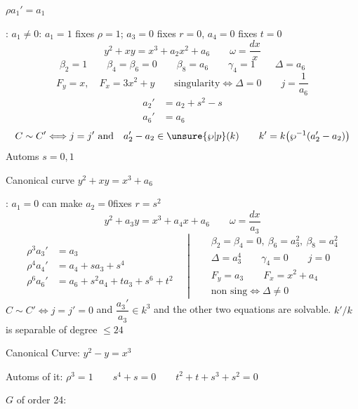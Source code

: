 \qquad $\rho a_1'=a_1$

: \quad $a_1\ne0$: \quad $a_1=1$ fixes $\rho=1$; $a_3=0$ fixes $r=0$, $a_4=0$ fixes $t=0$
\[
\boxed{y^2+xy=x^3+a_2x^2+a_6}\qquad \omega=\frac{dx}{x}
\]
\[
\beta_2=1\qquad \beta_4=\beta_6=0\qquad\beta_8=a_6\qquad\gamma_4=1\qquad\Delta=a_6
\]
\[
F_y=x,\quad F_x=3x^2+y\qquad \text{singularity}\Longleftrightarrow\Delta=0
\qquad j=\frac1{a_6}
\]
\[
\begin{aligned}
a_2'&=a_2+s^2-s\\
a_6'&=a_6
\end{aligned}
\]
\[
C\sim C'\Longleftrightarrow j=j'\ \text{and}\quad
a_2'-a_2\in\unsure{\wp|p}(k)\qquad k'=k\bigl(\wp^{-1}(a_2'-a_2)\bigr)
\]
Automs \quad $s=0,1$

Canonical curve \quad $y^2+xy=x^3+a_6$

: \quad $a_1=0$ \qquad can make $a_2=0$\qquad fixes $r=s^2$
\[
\boxed{y^2+a_3y=x^3+a_4x+a_6}\qquad \omega=\frac{dx}{a_3}
\]
\[
\begin{aligned}
\rho^3a_3'&=a_3\\
\rho^4a_4'&=a_4+sa_3+s^4\\
\rho^6a_6'&=a_6+s^2a_4+ta_3+s^6+t^2
\end{aligned}
\quad\left|\quad
\begin{aligned}
&\beta_2=\beta_4=0,\ \beta_6=a_3^2,\ \beta_8=a_4^2\\
&\Delta=a_3^4\qquad\gamma_4=0\qquad j=0\\
&F_y=a_3\qquad F_x=x^2+a_4\\
&\text{non sing}\Longleftrightarrow\Delta\ne0
\end{aligned}\right.
\]
$C\sim C'\Longleftrightarrow j=j'=0$ and $\dfrac{a_3'}{a_3}\in k^3$ and the other two equations are solvable. \quad $k'/k$ is separable of degree $\le24$

Canonical Curve: \quad $y^2-y=x^3$

Automs of it: \qquad $\rho^3=1\qquad s^4+s=0\qquad t^2+t+s^3+s^2=0$

$G$ of order 24:

